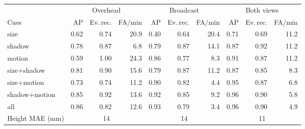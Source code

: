 \begin{tabular}{lrrrrrrrrr}
\toprule
 & \multicolumn{3}{c}{Overhead} & \multicolumn{3}{c}{Broadcast} & \multicolumn{3}{c}{Both views} \\
\cmidrule(lr){2-4}\cmidrule(lr){5-7}\cmidrule(lr){8-10}
Cues & AP & Ev.\,rec. & FA/min & AP & Ev.\,rec. & FA/min & AP & Ev.\,rec. & FA/min \\
\midrule
size & 0.62 & 0.74 & 20.9 & 0.40 & 0.64 & 20.4 & 0.71 & 0.69 & 11.2 \\
shadow & 0.78 & 0.87 & 6.8 & 0.79 & 0.87 & 14.1 & 0.87 & 0.92 & 11.2 \\
motion & 0.59 & 1.00 & 24.3 & 0.86 & 0.77 & 8.3 & 0.91 & 0.87 & 11.2 \\
size+shadow & 0.81 & 0.90 & 15.6 & 0.79 & 0.87 & 11.2 & 0.87 & 0.85 & 8.3 \\
size+motion & 0.73 & 0.74 & 11.2 & 0.90 & 0.82 & 4.4 & 0.95 & 0.87 & 6.8 \\
shadow+motion & 0.85 & 0.92 & 13.6 & 0.92 & 0.85 & 9.2 & 0.96 & 0.90 & 5.8 \\
all & 0.86 & 0.82 & 12.6 & 0.93 & 0.79 & 3.4 & 0.96 & 0.90 & 4.9 \\
\midrule
Height MAE (mm) & \multicolumn{3}{c}{14} & \multicolumn{3}{c}{14} & \multicolumn{3}{c}{11} \\
\bottomrule
\end{tabular}
